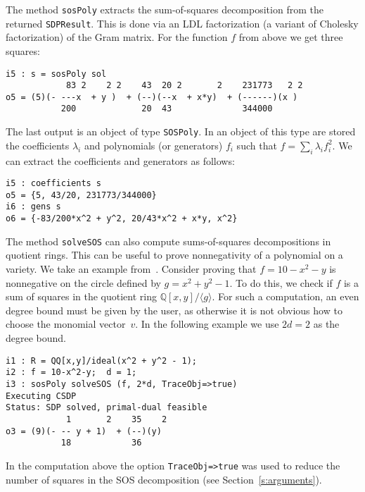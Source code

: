 \documentclass[11pt]{amsart}
\theoremstyle{plain}%
\theoremstyle{definition}
\theoremstyle{remark}
\newcommand{\SOS}{\textsc{SumsOfSquares}\xspace}
\newcommand{\QQ}{\mathbb{Q}}
\begin{document}
The method \verb|sosPoly| extracts the sum-of-squares decomposition from the returned \verb|SDPResult|.
This is done via an LDL factorization (a variant of Cholesky factorization) of the Gram matrix.
For the function $f$ from above we get three squares:
{\small
\begin{verbatim}
i5 : s = sosPoly sol
            83 2    2 2    43  20 2       2    231773   2 2
o5 = (5)(- ---x  + y )  + (--)(--x  + x*y)  + (------)(x )
           200             20  43              344000
\end{verbatim}
}
\noindent
The last output is an object of type \verb|SOSPoly|.
In an object of this type are stored the coefficients $\lambda_{i}$ and polynomials (or generators) $f_{i}$  such that $f = \sum_{i}\lambda_{i}f_{i}^{2}$.
We can extract the coefficients and generators as follows:
{\small
\begin{verbatim}
i5 : coefficients s
o5 = {5, 43/20, 231773/344000}
i6 : gens s
o6 = {-83/200*x^2 + y^2, 20/43*x^2 + x*y, x^2}
\end{verbatim}
}

The method \verb|solveSOS| can also compute sums-of-squares decompositions in quotient rings.
This can be useful to prove nonnegativity of a polynomial on a variety.
We take an example from~\cite{parrilo2005exploiting}.
Consider proving that $f = 10{-}x^2{-}y$ is nonnegative on the circle defined by $g = x^2 {+} y^2 {-} 1$.
To do this, we check if $f$ is a sum of squares in the quotient ring $\QQ[x,y]/\langle g\rangle$.
For such a computation, an even degree bound must be given by the user, 
as otherwise it is not obvious how to choose the monomial vector~$v$.
In the following example we use $2d=2$ as the degree bound.
{\small
\begin{verbatim}
i1 : R = QQ[x,y]/ideal(x^2 + y^2 - 1);
i2 : f = 10-x^2-y;  d = 1;
i3 : sosPoly solveSOS (f, 2*d, TraceObj=>true)
Executing CSDP
Status: SDP solved, primal-dual feasible
            1       2    35    2
o3 = (9)(- -- y + 1)  + (--)(y)
           18            36
\end{verbatim}
}
\noindent
In the computation above the option \verb|TraceObj=>true| was used to reduce the number of squares in the SOS decomposition (see Section~\ref{s:arguments}).

\end{document}
